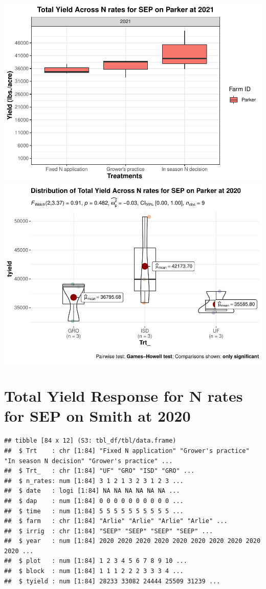 \documentclass[
]{article}
\begin{document}
\includegraphics{NoffsiteT_files/figure-latex/unnamed-chunk-7-1.pdf}
\includegraphics{NoffsiteT_files/figure-latex/unnamed-chunk-7-2.pdf}

\hypertarget{total-yield-response-for-n-rates-for-sep-on-smith-at-2020}{%
\section{Total Yield Response for N rates for SEP on Smith at
2020}\label{total-yield-response-for-n-rates-for-sep-on-smith-at-2020}}

\begin{verbatim}
## tibble [84 x 12] (S3: tbl_df/tbl/data.frame)
##  $ Trt    : chr [1:84] "Fixed N application" "Grower's practice" "In season N decision" "Grower's practice" ...
##  $ Trt_   : chr [1:84] "UF" "GRO" "ISD" "GRO" ...
##  $ n_rates: num [1:84] 3 1 2 1 3 2 3 1 2 3 ...
##  $ date   : logi [1:84] NA NA NA NA NA NA ...
##  $ dap    : num [1:84] 0 0 0 0 0 0 0 0 0 0 ...
##  $ time   : num [1:84] 5 5 5 5 5 5 5 5 5 5 ...
##  $ farm   : chr [1:84] "Arlie" "Arlie" "Arlie" "Arlie" ...
##  $ irrig  : chr [1:84] "SEEP" "SEEP" "SEEP" "SEEP" ...
##  $ year   : num [1:84] 2020 2020 2020 2020 2020 2020 2020 2020 2020 2020 ...
##  $ plot   : num [1:84] 1 2 3 4 5 6 7 8 9 10 ...
##  $ block  : num [1:84] 1 1 1 2 2 2 3 3 3 4 ...
##  $ tyield : num [1:84] 28233 33082 24444 25509 31239 ...
\end{verbatim}
\end{document}
